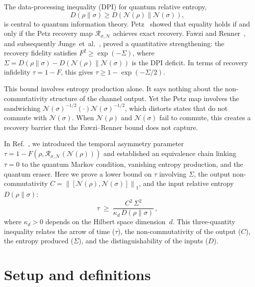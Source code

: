 \documentclass[prl,twocolumn,superscriptaddress,longbibliography,floatfix]{revtex4-2}
\newcommand{\Petz}{\mathcal{R}}
\newcommand{\chan}{\mathcal{N}}
\newcommand{\norm}[1]{\left\|#1\right\|}
\newcommand{\tauasym}{\tau}
\newcommand{\kd}{\kappa_d}
\begin{document}
The data-processing inequality (DPI) for quantum relative entropy,
\begin{equation}
D(\rho\|\sigma) \geq D(\chan(\rho)\|\chan(\sigma)),
\label{eq:dpi}
\end{equation}
is central to quantum information theory.
Petz~\cite{Petz1986,Petz1988} showed that equality holds if
and only if the Petz recovery map
$\Petz_{\sigma,\chan}$ achieves exact recovery.
Fawzi and Renner~\cite{Fawzi2015}, and subsequently
Junge~et~al.~\cite{Junge2018}, proved a quantitative
strengthening: the recovery fidelity satisfies
$F^2 \geq \exp(-\Sigma)$, where $\Sigma = D(\rho\|\sigma)
- D(\chan(\rho)\|\chan(\sigma))$ is the DPI deficit.
In terms of recovery infidelity $\tauasym = 1 - F$, this
gives $\tauasym \geq 1 - \exp(-\Sigma/2)$.

This bound involves entropy production alone.  It says nothing
about the non-commutativity structure of the channel output.
Yet the Petz map involves the sandwiching
$\chan(\sigma)^{-1/2}(\cdot)\chan(\sigma)^{-1/2}$, which
distorts states that do not commute with $\chan(\sigma)$.
When $\chan(\rho)$ and $\chan(\sigma)$ fail to commute,
this creates a recovery barrier that the Fawzi--Renner
bound does not capture.

In Ref.~\cite{Huang2026}, we introduced the temporal
asymmetry parameter $\tauasym = 1 - F(\rho,
\Petz_{\sigma,\chan}(\chan(\rho)))$ and established an
equivalence chain linking $\tauasym = 0$ to the quantum
Markov condition, vanishing entropy production, and the
quantum eraser.
Here we prove a lower bound on $\tauasym$ involving
$\Sigma$, the output non-commutativity
$C = \norm{[\chan(\rho), \chan(\sigma)]}_1$,
and the input relative entropy $D(\rho\|\sigma)$:
\begin{equation}
\boxed{\tauasym \;\geq\; \frac{C^2\, \Sigma^2}
  {\kd\, D(\rho\|\sigma)}\,,}
\label{eq:main}
\end{equation}
where $\kd > 0$ depends on the Hilbert space dimension~$d$.
This three-quantity inequality relates the arrow of time
($\tauasym$), the non-commutativity of the output ($C$),
the entropy produced ($\Sigma$), and the distinguishability
of the inputs ($D$).

\section{Setup and definitions}
\label{sec:setup}
\end{document}
